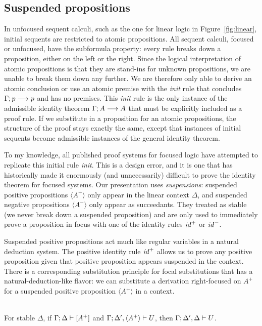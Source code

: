 \subsection{Suspended propositions}

In unfocused sequent calculi, such as the one for linear logic in
Figure~\ref{fig:linear}, initial sequents are restricted to atomic
propositions. All sequent calculi, focused or unfocused, have the
subformula property: every rule breaks down a proposition, either on
the left or the right. Since the logical interpretation of atomic
propositions is that they are stand-ins for unknown propositions, we
are unable to break them down any further. We are therefore only able
to derive an atomic conclusion or use an atomic premise with the {\it
  init} rule that concludes ${\Gamma};{p} \longrightarrow {p} \mathstrut$ and has no premises.
This {\it init} rule is the only instance of the admissible identity
theorem ${\Gamma};{A} \longrightarrow {A} \mathstrut$ that must be explicitly included as a
proof rule. If we substitute in a proposition for an atomic
propositions, the structure of the proof stays exactly the same,
except that instances of initial sequents become admissible instances
of the general identity theorem.

To my knowledge, all published proof systems for focused logic have
attempted to replicate this initial rule {\it init}. This is a design
error, and it is one that has historically made it enormously (and
unnecessarily) difficult to prove the identity theorem for focused
systems. Our presentation uses {\it suspensions}: suspended positive
propositions $\langle A^+ \rangle$ only appear in the linear context
$\Delta$, and suspended negative propositions $\langle A^- \rangle$
only appear as succeedants. They treated as stable (we never break
down a suspended proposition) and are only used to immediately
prove a proposition in focus with one of the identity rules
${\it id}^+$ or ${\it id}^-$.

Suspended positive propositions act much like regular variables in a
natural deduction system. The positive identity rule ${\it id}^+$
allows us to prove any positive proposition given that positive
proposition appears suspended in the context.  There is a
corresponding substitution principle for focal substitutions that has
a natural-deduction-like flavor: we can substitute a derivation
right-focused on $A^+$ for a suspended positive proposition $\langle
A^+ \rangle$ in a context.

\bigskip
\begin{theorem}\label{thm:fsubst-pos}~\\
For stable $\Delta$,
if ${\Gamma};{\Delta} \vdash {[A^+]} \mathstrut$ 
and ${\Gamma};{\Delta', \langle A^+ \rangle} \vdash {U} \mathstrut$, 
then ${\Gamma};{\Delta', \Delta} \vdash {U} \mathstrut$.
\end{theorem}

